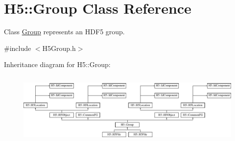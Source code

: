 \hypertarget{class_h5_1_1_group}{}\section{H5\+:\+:Group Class Reference}
\label{class_h5_1_1_group}


Class \hyperlink{class_h5_1_1_group}{Group} represents an H\+D\+F5 group.  




{\ttfamily \#include $<$H5\+Group.\+h$>$}

Inheritance diagram for H5\+:\+:Group\+:\begin{figure}[H]
\begin{center}
\leavevmode
\includegraphics[height=3.652174cm]{class_h5_1_1_group}
\end{center}
\end{figure}
